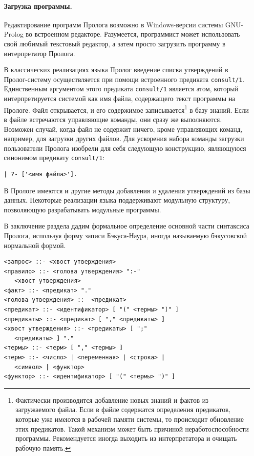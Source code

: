 \documentclass[12pt, openany, twoside]{book} %
\begin{document}
\paragraph{Загрузка программы.} Редактирование программ Пролога возможно в Windows-версии системы GNU-Prolog во встроенном редакторе. Разумеется, программист может использовать свой любимый текстовый редактор, а затем просто загрузить программу в интерпретатор Пролога.

В классических реализациях языка Пролог введение списка утверждений в Пролог-систему осуществляется при помощи встроенного предиката {\tt consult/1}. Единственным аргументом этого предиката {\tt consult/1} является атом, который интерпретируется системой как имя файла, содержащего текст программы на Прологе. Файл открывается, и его содержимое записывается\footnote{Фактически производится добавление новых знаний и фактов из загружаемого файла. Если в файле содержатся определения предикатов, которые уже имеются в рабочей памяти системы, то происходит обновление этих предикатов. Такой механизм может быть причиной неработоспособности программы. Рекомендуется иногда выходить из интерпретатора и очищать рабочую память.} в базу знаний. Если в файле встречаются управляющие команды, они сразу же выполняются. Возможен случай, когда файл не содержит ничего, кроме управляющих команд, например, для загрузки других файлов. Для ускорения набора команды загрузки пользователи Пролога изобрели для себя следующую конструкцию, являющуюся синонимом предикату {\tt consult/1}:
{\tt\begin{verbatim}
| ?- ['<имя файла>'].
\end{verbatim}}

В Прологе имеются и другие методы добавления и удаления утверждений из базы данных. Некоторые реализации языка поддерживают модульную структуру, позволяющую разрабатывать модульные программы.

В заключение раздела дадим формальное определение основной части синтаксиса Пролога, используя форму записи Бэкуса-Наура, иногда называемую бэкусовской нормальной формой.

{\tt\begin{verbatim}
<запрос> ::- <хвост утверждения>
<правило> ::- <голова утверждения> ":-"
   <хвост утверждения>
<факт> ::- <предикат> "."
<голова утверждения> ::- <предикат>
<предикат> ::- <идентификатор> [ "(" <термы> ")" ]
<предикаты> ::- <предикат> [ "," <предикаты> ]
<хвост утверждения> ::- <предикаты> [ ";"
   <предикаты> ] "."
<термы> ::- <терм> [ "," <термы> ]
<терм> ::- <число> | <переменная> | <строка> |
   <символ> | <функтор>
<функтор> ::- <идентификатор> [ "(" <термы> ")" ]
\end{verbatim}}
\end{document}
